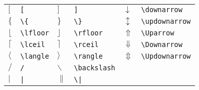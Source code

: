 \begin{tabular}{llllll}
$[$                  & \verb+[+                  & $]$                     & \verb+]+                   & $\downarrow$   & \verb+\downarrow+ \\
$\{$                 & \verb+\{+                 & $\}$                    & \verb+\}+                  & $\updownarrow$ & \verb+\updownarrow+ \\
$\lfloor$            & \verb+\lfloor+            & $\rfloor$               & \verb+\rfloor+             & $\Uparrow$     & \verb+\Uparrow+ \\
$\lceil$             & \verb+\lceil+             & $\rceil$                & \verb+\rceil+              & $\Downarrow$   & \verb+\Downarrow+ \\
$\langle$            & \verb+\langle+            & $\rangle$               & \verb+\rangle+             & $\Updownarrow$ & \verb+\Updownarrow+ \\
$/$                  & \verb+/+                  & $\backslash$            & \verb+\backslash+ \\ 
$|$                  & \verb+|+                  & $\|$                    & \verb+\|+ \\
\end{tabular}          
\newpage

